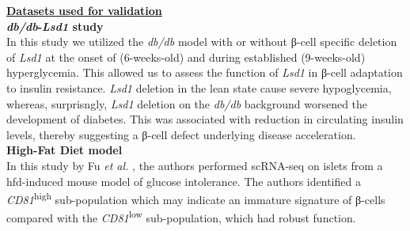 \underline{\normalsize \textbf{Datasets used for validation}}\\

\textbf{\textit{db/db}-\textit{Lsd1} study\\}
In this study we utilized the \textit{db/db} model with or without β-cell specific deletion of \textit{Lsd1} at the onset of (6-weeks-old) and during established (9-weeks-old) hyperglycemia. This allowed us to assess the function of \textit{Lsd1} in β-cell adaptation to insulin resistance. \textit{Lsd1} deletion in the lean state cause severe hypoglycemia, whereas, surprisngly, \textit{Lsd1} deletion on the \textit{db/db} background worsened the development of diabetes. This was associated with reduction in circulating insulin levels, thereby suggesting a β-cell defect underlying disease acceleration.\\ 

\textbf{High-Fat Diet model\\}
In this study by Fu \textit{et al.} \textbf{\cite{fu_single-cell_2023}}, the authors performed scRNA-seq on islets from a \gls{hfd}-induced mouse model of glucose intolerance. The authors identified a \textit{CD81}\textsuperscript{high} sub-population which may indicate an immature signature of β-cells compared with the \textit{CD81}\textsuperscript{low} sub-population, which had robust function.\\


